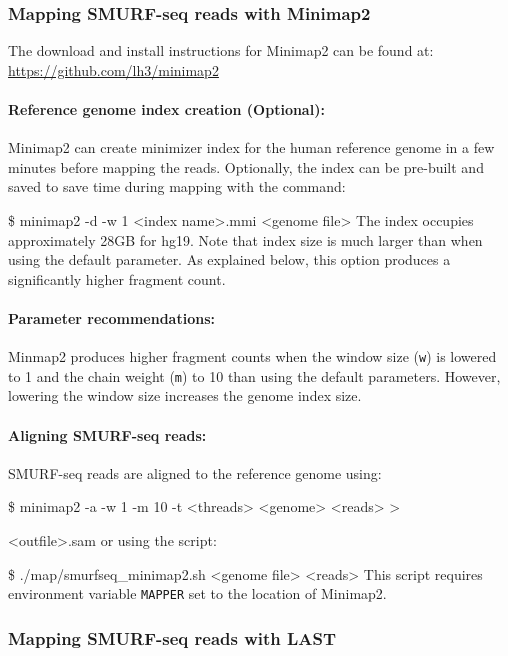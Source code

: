 \documentclass[11pt]{article}
\newenvironment{cmd}
{\list{}{
    \parsep=0em
    \itemindent=17pt
    \listparindent=50pt
    \leftmargin=0in
    \rightmargin=0in
  }\item[] \ttfamily \$}
{\endlist}
\begin{document}
\subsubsection{Mapping SMURF-seq reads with Minimap2}
\label{minimap}

The download and install instructions for Minimap2 can be found at:
\url{https://github.com/lh3/minimap2}

\paragraph{Reference genome index creation (Optional):}
Minimap2 can create minimizer index for the human reference genome in
a few minutes before mapping the reads. Optionally, the
index can be pre-built and saved to save time during mapping with
the command:
\begin{cmd}
  minimap2 -d -w 1 <index name>.mmi <genome file>
\end{cmd}
The index occupies approximately 28GB for hg19. Note that index size
is much larger than when using the default parameter. As explained below,
this option produces a significantly higher fragment count.

\paragraph{Parameter recommendations:}
Minmap2 produces higher fragment counts when the window size (\texttt{w})
is lowered to 1 and the chain weight (\texttt{m}) to 10 than using the
default parameters. However, lowering the window size increases the
genome index size.


\paragraph{Aligning SMURF-seq reads:}
SMURF-seq reads are aligned to the reference genome using:
\begin{cmd}
  minimap2 -a -w 1 -m 10 -t <threads> <genome> <reads> >
    \par <outfile>.sam
\end{cmd}
or using the script:
\begin{cmd}
  ./map/smurfseq\_minimap2.sh <genome file> <reads>
\end{cmd}
This script requires environment variable \texttt{MAPPER} set to the
location of Minimap2.

\subsubsection{Mapping SMURF-seq reads with LAST}
\label{last}
\end{document}
